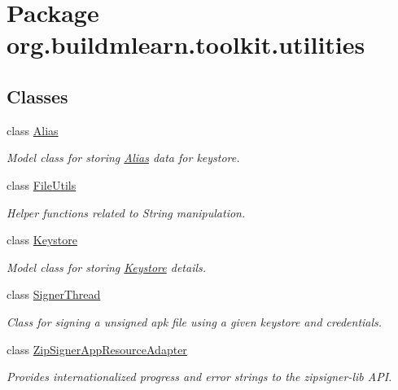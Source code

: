 \hypertarget{namespaceorg_1_1buildmlearn_1_1toolkit_1_1utilities}{\section{Package org.\-buildmlearn.\-toolkit.\-utilities}
\label{namespaceorg_1_1buildmlearn_1_1toolkit_1_1utilities}
}
\subsection*{Classes}
\begin{DoxyCompactItemize}
\item 
class \hyperlink{classorg_1_1buildmlearn_1_1toolkit_1_1utilities_1_1Alias}{Alias}
\begin{DoxyCompactList}\small\item\em Model class for storing \hyperlink{classorg_1_1buildmlearn_1_1toolkit_1_1utilities_1_1Alias}{Alias} data for keystore. \end{DoxyCompactList}\item 
class \hyperlink{classorg_1_1buildmlearn_1_1toolkit_1_1utilities_1_1FileUtils}{File\-Utils}
\begin{DoxyCompactList}\small\item\em Helper functions related to String manipulation. \end{DoxyCompactList}\item 
class \hyperlink{classorg_1_1buildmlearn_1_1toolkit_1_1utilities_1_1Keystore}{Keystore}
\begin{DoxyCompactList}\small\item\em Model class for storing \hyperlink{classorg_1_1buildmlearn_1_1toolkit_1_1utilities_1_1Keystore}{Keystore} details. \end{DoxyCompactList}\item 
class \hyperlink{classorg_1_1buildmlearn_1_1toolkit_1_1utilities_1_1SignerThread}{Signer\-Thread}
\begin{DoxyCompactList}\small\item\em Class for signing a unsigned apk file using a given keystore and credentials. \end{DoxyCompactList}\item 
class \hyperlink{classorg_1_1buildmlearn_1_1toolkit_1_1utilities_1_1ZipSignerAppResourceAdapter}{Zip\-Signer\-App\-Resource\-Adapter}
\begin{DoxyCompactList}\small\item\em Provides internationalized progress and error strings to the zipsigner-\/lib A\-P\-I. \end{DoxyCompactList}\end{DoxyCompactItemize}
